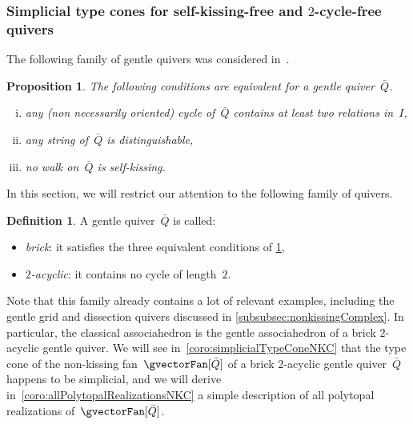 \documentclass{amsart}
\newtheorem{proposition}[theorem]{Proposition}
\theoremstyle{definition}
\newtheorem{definition}[theorem]{Definition}
\newcommand{\darkblue}{\color{darkblue}} %
\newcommand{\defn}[1]{\textsl{\darkblue #1}} %
\newcommand{\quiver}{\bar Q} %
\begin{document}

\subsubsection{Simplicial type cones for self-kissing-free and $2$-cycle-free quivers}
\label{subsubsec:simplicialTypeConeNKC}

The following family of gentle quivers was considered in~\cite[Sect.~4]{GarverMcConvilleMousavand}.

\begin{proposition}
\label{prop:noSelfKissing}
The following conditions are equivalent for a gentle quiver~$\quiver$.
\begin{enumerate}[(i)]
\item any (non necessarily oriented) cycle of~$\quiver$ contains at least two relations in~$I$,
\item any string of~$\quiver$ is distinguishable,
\item no walk on~$\quiver$ is self-kissing.
\end{enumerate}
\end{proposition}

In this section, we will restrict our attention to the following family of quivers.

\begin{definition}
\label{def:brick2acyclic}
A gentle quiver~$\quiver$ is called:
\begin{itemize}
\item \defn{brick}: it satisfies the three equivalent conditions of \cref{prop:noSelfKissing},
\item \defn{$2$-acyclic}: it contains no cycle of length~$2$.
\end{itemize}
\end{definition}

Note that this family already contains a lot of relevant examples, including the gentle grid and dissection quivers discussed in \cref{subsubsec:nonkissingComplex}.
In particular, the classical associahedron is the gentle associahedron of a brick $2$-acyclic gentle quiver.
We will see in~\cref{coro:simplicialTypeConeNKC} that the type cone of the non-kissing fan~$\gvectorFan[\quiver]$ of a brick $2$-acyclic gentle quiver~$\quiver$ happens to be simplicial, and we will derive in~\cref{coro:allPolytopalRealizationsNKC} a simple description of all polytopal realizations of~$\gvectorFan[\quiver]$.
\end{document}
